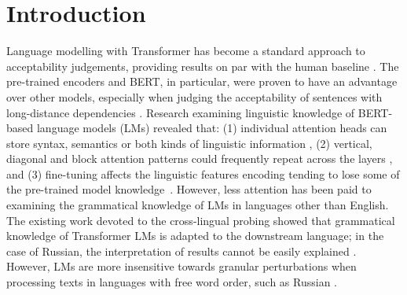 \documentclass[11pt]{article}
\begin{document}
\section{Introduction}
Language modelling with Transformer \cite{vaswani2017attention} has become a standard approach to acceptability judgements, providing results on par with the human baseline \cite{warstadt-etal-2019-neural}. 
The pre-trained encoders and BERT, in particular, were proven to have an advantage over other models, especially when judging the acceptability of sentences with long-distance dependencies \cite{Warstadt2019LinguisticAO}.  
Research examining linguistic knowledge of BERT-based language models (LMs) revealed that: (1) individual attention heads can store syntax, semantics or both kinds of linguistic information \cite{jo-myaeng-2020-roles,clark-etal-2019-bert}, (2) vertical, diagonal and block attention patterns could frequently repeat across the layers \cite{kovaleva-etal-2019-revealing}, and (3) fine-tuning affects the linguistic features encoding tending to lose some of the pre-trained model knowledge~\cite{miaschi-etal-2020-linguistic}. 
However, less attention has been paid to examining the grammatical knowledge of LMs in languages other than English. 
The existing work devoted to the cross-lingual probing showed that grammatical knowledge of Transformer LMs is adapted to the downstream language; in the case of Russian, the interpretation of results cannot be easily explained \cite{ravishankar-etal-2019-multilingual}. However, LMs are more insensitive towards granular perturbations when processing texts in languages with free word order, such as Russian \cite{taktasheva-etal-2021-shaking}.
\end{document}
